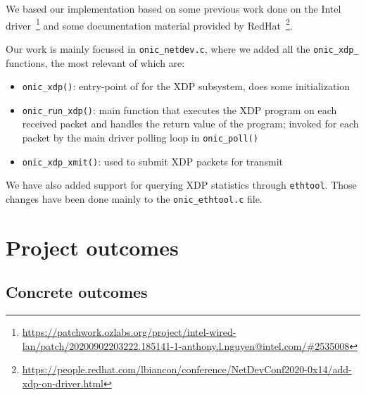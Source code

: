 \documentclass[10pt,a4]{article}
\begin{document}


We based our implementation based on some previous work done on the Intel
driver~\footnote{\url{https://patchwork.ozlabs.org/project/intel-wired-lan/patch/20200902203222.185141-1-anthony.l.nguyen@intel.com/\#2535008}}
and some documentation material provided by RedHat~\footnote{\url{https://people.redhat.com/lbiancon/conference/NetDevConf2020-0x14/add-xdp-on-driver.html}}.

Our work is mainly focused in \texttt{onic\_netdev.c}, where we added all the
\texttt{onic\_xdp\_\*} functions, the most relevant of which are:

\begin{itemize}
  \item \texttt{onic\_xdp()}: entry-point of for the XDP subsystem, does some
    initialization
  \item \texttt{onic\_run\_xdp()}: main function that executes the XDP program
    on each received packet and handles the return value of the program; invoked
    for each packet by the main driver polling loop in \texttt{onic\_poll()}
  \item \texttt{onic\_xdp\_xmit()}: used to submit XDP packets for transmit
\end{itemize}

We have also added support for querying XDP statistics through \texttt{ethtool}.
Those changes have been done mainly to the \texttt{onic\_ethtool.c} file.


\section{Project outcomes}

\subsection{Concrete outcomes}
%
\end{document}
